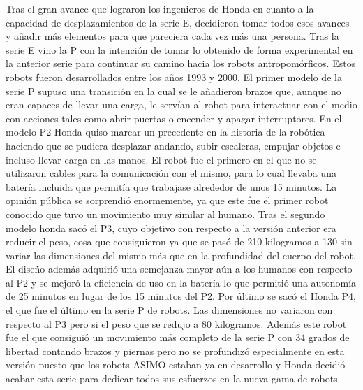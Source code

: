 Tras el gran avance que lograron los ingenieros de Honda en cuanto a la capacidad de desplazamientos de la serie E, decidieron tomar todos esos avances y añadir más elementos para que pareciera cada vez más una persona. Tras la serie E vino la P con la intención de tomar lo obtenido de forma experimental en la anterior serie para continuar su camino hacia los robots antropomórficos. Estos robots fueron desarrollados entre los años 1993 y 2000. El primer modelo de la serie P supuso una transición en la cual se le añadieron brazos que, aunque no eran capaces de llevar una carga, le servían al robot para interactuar con el medio con acciones tales como abrir puertas o encender y apagar interruptores. En el modelo P2 Honda quiso marcar un precedente en la historia de la robótica haciendo que se pudiera desplazar andando, subir escaleras, empujar objetos e incluso llevar carga en las manos. El robot fue el primero en el que no se utilizaron cables para la comunicación con el mismo, para lo cual llevaba una batería incluida que permitía que trabajase alrededor de unos 15 minutos. La opinión pública se sorprendió enormemente, ya que este fue el primer robot conocido que tuvo un movimiento muy similar al humano. Tras el segundo modelo honda sacó el P3, cuyo objetivo con respecto a la versión anterior era reducir el peso, cosa que consiguieron ya que se pasó de 210 kilogramos a 130 sin variar las dimensiones del mismo más que en la profundidad del cuerpo del robot. El diseño además adquirió una semejanza mayor aún a los humanos con respecto al P2 y se mejoró la eficiencia de uso en la batería lo que permitió una autonomía de 25 minutos en lugar de los 15 minutos del P2. Por último se sacó el Honda P4, el que fue el último en la serie P de robots. Las dimensiones no variaron con respecto al P3 pero si el peso que se redujo a 80 kilogramos. Además este robot fue el que consiguió un movimiento más completo de la serie P con 34 grados de libertad contando brazos y piernas pero no se profundizó especialmente en esta versión puesto que los robots ASIMO estaban ya en desarrollo y Honda decidió acabar esta serie para dedicar todos sus esfuerzos en la nueva gama de robots.

\vspace{10px}

